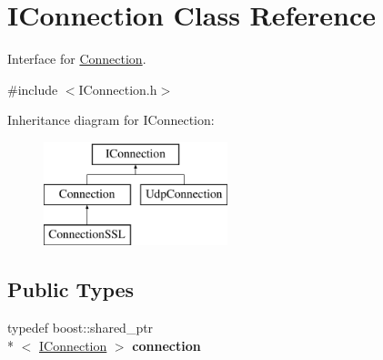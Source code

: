 \hypertarget{class_i_connection}{\section{I\-Connection Class Reference}
\label{class_i_connection}
}


Interface for \hyperlink{class_connection}{Connection}.  




{\ttfamily \#include $<$I\-Connection.\-h$>$}

Inheritance diagram for I\-Connection\-:\begin{figure}[H]
\begin{center}
\leavevmode
\includegraphics[height=3.000000cm]{class_i_connection}
\end{center}
\end{figure}
\subsection*{Public Types}
\begin{DoxyCompactItemize}
\item 
\hypertarget{class_i_connection_ada45d66792ba21839e28391ba3703186}{typedef boost\-::shared\-\_\-ptr\\*
$<$ \hyperlink{class_i_connection}{I\-Connection} $>$ {\bfseries connection}}\label{class_i_connection_ada45d66792ba21839e28391ba3703186}

\end{DoxyCompactItemize}
